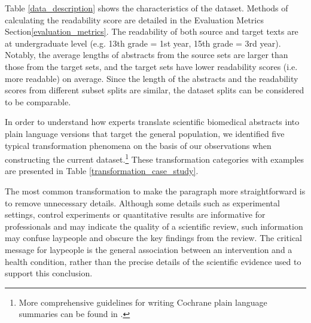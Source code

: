 \documentclass[letterpaper, table]{article} %
\begin{document}
Table \ref{data_description} shows the characteristics of the dataset. Methods of calculating the readability score are detailed in the Evaluation Metrics Section\ref{evaluation_metrics}. The readability of both source and target texts are at undergraduate level (e.g. 13th grade = 1st year, 15th grade = 3rd year). Notably, the average lengths of abstracts from the source sets are larger than those from the target sets, and the target sets have lower readability scores (i.e. more readable) on average. Since the length of the abstracts and the readability scores from different subset splits are similar, the dataset splits can be considered to be comparable. 



In order to understand how experts translate scientific biomedical abstracts into plain language versions that target the general population, we identified five typical transformation phenomena on the basis of our observations when constructing the current dataset.\footnote{More comprehensive guidelines for writing Cochrane plain language summaries can be found in \citet{mcilwain2014standards}.} These transformation categories with examples are presented in Table \ref{transformation_case_study}. 

The most common transformation to make the paragraph more straightforward is to remove unnecessary details. Although some details such as experimental settings, control experiments or quantitative results are informative for professionals and may indicate the quality of a scientific review, such information
may confuse laypeople and obscure the key findings from the review. 
The critical message for laypeople is the general association between an intervention and a health condition, rather than the precise details of the scientific evidence used to support this conclusion. 
\end{document}
